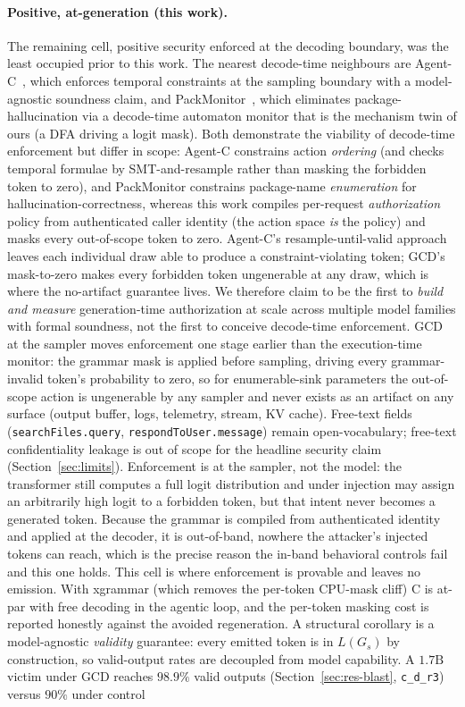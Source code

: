 \paragraph{Positive, at-generation (this work).}
The remaining cell, positive security enforced at the decoding boundary, was the least occupied prior to this work. The nearest decode-time neighbours are Agent-C~\cite{agentc2025}, which enforces temporal constraints at the sampling boundary with a model-agnostic soundness claim, and PackMonitor~\cite{packmonitor2026}, which eliminates package-hallucination via a decode-time automaton monitor that is the mechanism twin of ours (a DFA driving a logit mask). Both demonstrate the viability of decode-time enforcement but differ in scope: Agent-C constrains action \emph{ordering} (and checks temporal formulae by SMT-and-resample rather than masking the forbidden token to zero), and PackMonitor constrains package-name \emph{enumeration} for hallucination-correctness, whereas this work compiles per-request \emph{authorization} policy from authenticated caller identity (the action space \emph{is} the policy) and masks every out-of-scope token to zero. Agent-C's resample-until-valid approach leaves each individual draw able to produce a constraint-violating token; GCD's mask-to-zero makes every forbidden token ungenerable at any draw, which is where the no-artifact guarantee lives. We therefore claim to be the first to \emph{build and measure} generation-time authorization at scale across multiple model families with formal soundness, not the first to conceive decode-time enforcement. GCD at the sampler moves enforcement one stage earlier than the execution-time monitor: the grammar mask is applied before sampling, driving every grammar-invalid token's probability to zero, so for enumerable-sink parameters the out-of-scope action is ungenerable by any sampler and never exists as an artifact on any surface (output buffer, logs, telemetry, stream, KV cache). Free-text fields (\texttt{searchFiles.query}, \texttt{respondToUser.message}) remain open-vocabulary; free-text confidentiality leakage is out of scope for the headline security claim (Section~\ref{sec:limits}). Enforcement is at the sampler, not the model: the transformer still computes a full logit distribution and under injection may assign an arbitrarily high logit to a forbidden token, but that intent never becomes a generated token. Because the grammar is compiled from authenticated identity and applied at the decoder, it is out-of-band, nowhere the attacker's injected tokens can reach, which is the precise reason the in-band behavioral controls fail and this one holds. This cell is where enforcement is provable and leaves no emission. With xgrammar (which removes the per-token CPU-mask cliff) C is at-par with free decoding in the agentic loop, and the per-token masking cost is reported honestly against the avoided regeneration. A structural corollary is a model-agnostic \emph{validity} guarantee: every emitted token is in \(L(G_s)\) by construction, so valid-output rates are decoupled from model capability. A \(1.7\mathrm{B}\) victim under GCD reaches \(98.9\%\) valid outputs (Section~\ref{sec:res-blast}, \texttt{c\_d\_r3}) versus \(90\%\) under control 